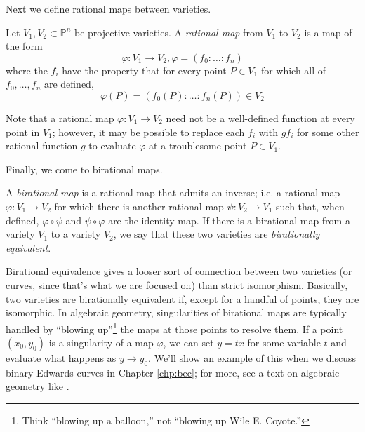 Next we define rational maps between varieties.
\begin{dfn}
Let $V_1, V_2 \subset \mathbb{P}^n$ be projective varieties.
A \textit{rational map} from $V_1$ to $V_2$ is a map of the form
\[
\varphi: V_1 \to V_2, \varphi = (f_0 : \ldots: f_n)
\]
    where the $f_i$ have the property that for every point $P \in V_1$ for
    which all of $f_0,\ldots,f_n$ are defined,
\[
\varphi(P) = (f_0(P): \ldots:f_n(P)) \in V_2
\]
\end{dfn}
Note that a rational map $\varphi: V_1 \to V_2$ need not be a well-defined
    function at every point in $V_1$; however, it may be possible to replace
    each $f_i$ with $gf_i$ for some other rational function $g$ to evaluate
    $\varphi$ at a troublesome point $P \in V_1$.

Finally, we come to birational maps.
\begin{dfn}
A \textit{birational map} is a rational map that admits an inverse; i.e. a
    rational map $\varphi: V_1 \to V_2$ for which there is another rational map
    $\psi: V_2 \to V_1$ such that, when defined, $\varphi \circ \psi$ and $\psi
    \circ \varphi$ are the identity map.
If there is a birational map from a variety $V_1$ to a variety $V_2$, we say
    that these two varieties are \textit{birationally equivalent}.
\end{dfn}
Birational equivalence gives a looser sort of connection between two varieties
    (or curves, since that's what we are focused on) than strict isomorphism.
Basically, two varieties are birationally equivalent if, except for a handful
    of points, they are isomorphic.
In algebraic geometry, singularities of birational maps are typically handled
    by ``blowing up''\footnote{Think ``blowing up a balloon,'' not ``blowing up
    Wile E. Coyote.''} the maps at those points to resolve them.
If a point $(x_0, y_0)$ is a singularity of a map $\varphi$, we can set $y =
    tx$ for some variable $t$ and evaluate what happens as $y \to y_0$.
We'll show an example of this when we discuss binary Edwards curves in Chapter
    \ref{chp:bec}; for more, see a text on algebraic geometry like
    \cite{hartshorne1977algebraic}.



